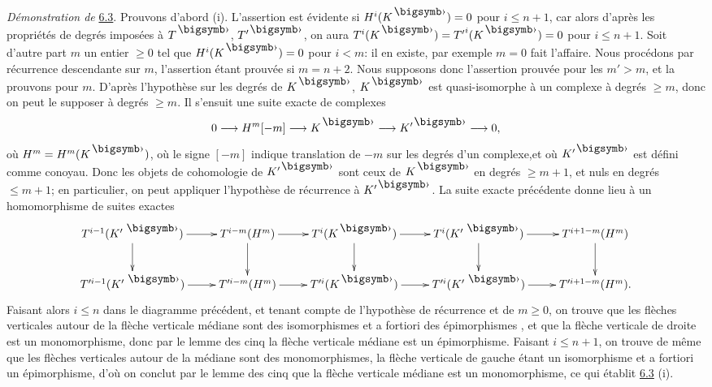 \documentclass[10pt]{../fichiers-configuration-latex/smfart}
\begin{document}
\medskip
\noindent
\emph{Démonstration de} \hyperref[XII.cor6.3]{6.3}. Prouvons d'abord (i). L'assertion est
évidente si $H^{i}(K^{\bigdot})=0$ pour $i\leq n+1$, car alors d'après
les propriétés de degrés imposées à $T^{\bigdot}$, $T'^{\bigdot}$, on
aura $T^{i}(K^{\bigdot})={T'}^{i}(K^{\bigdot})=0$ pour $i\leq
n+1$. Soit d'autre part $m$ un entier $\geq 0$ tel que
$H^{i}(K^{\bigdot})=0$ pour $i<m$: il en existe, par exemple $m=0$
fait l'affaire. Nous procédons par récurrence descendante sur $m$,
l'assertion étant prouvée si $m=n+2$. Nous supposons donc l'assertion
prouvée pour les $m'>m$, et la prouvons pour $m$. D'après l'hypothèse
sur les degrés de $K^{\bigdot}$, $K^{\bigdot}$ est quasi-isomorphe à
un complexe à degrés $\geq m$, donc on peut le supposer à degrés $\geq
m$. Il s'ensuit une suite exacte de complexes
$$
0\longrightarrow H^m[-m]\longrightarrow K^{\bigdot}\longrightarrow
K'^{\bigdot}\longrightarrow 0{\quoi},
$$
où $H^m=H^m(K^{\bigdot})$, où le signe $[-m]$ indique translation de
$-m$ sur les degrés d'un complexe,\pageoriginale et où $K'^{\bigdot}$
est défini comme conoyau. Donc les objets de cohomologie de
$K'^{\bigdot}$ sont ceux de $K^{\bigdot}$ en degrés $\geq m+1$, et
nuls en degrés $\leq m+1$; en particulier, on peut appliquer
l'hypothèse de récurrence à $K'^{\bigdot}$. La suite exacte précédente
donne lieu à un homomorphisme de suites exactes
$$
\xymatrix{
T^{i-1} (K'^{\;\bigdot}) \ar[d] \ar[r] & T^{i-m}(H^m)  \ar[r]\ar[d] &
T^{i}(K^{\bigdot}) \ar[r] \ar[d]& T^{i} (K'^{\;\bigdot})  \ar[r] \ar[d]&
T^{i+1-m}(H^m) \ar[d]\\
T'^{i-1}(K'^{\;\bigdot})  \ar[r] & T'^{i-m}(H^m)  \ar[r] &
T'^{i}(K^{\bigdot})  \ar[r] & T'^{i}(K'^{\;\bigdot})  \ar[r] & T'^{i+1-m}(H^m).
}
$$
Faisant alors $i\leq n$ dans le diagramme précédent, et tenant compte
de l'hypothèse de récurrence et de $m\geq 0$, on trouve que les
flèches verticales autour de la flèche verticale médiane sont des
isomorphismes et a fortiori des épimorphismes , et que la flèche
verticale de droite est un monomorphisme, donc par le lemme des cinq
la flèche verticale médiane est un épimorphisme. Faisant $i\leq n+1$,
on trouve de même que les flèches verticales autour de la médiane sont
des monomorphismes, la flèche verticale de gauche étant un
isomorphisme et a fortiori un épimorphisme, d'où on conclut par le
lemme des cinq que la flèche verticale médiane est un monomorphisme,
ce qui établit \hyperref[XII.cor6.3]{6.3} (i).
\end{document}
